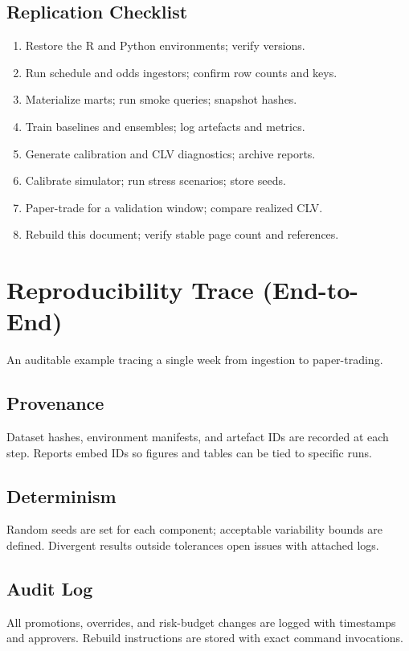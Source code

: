 \subsection{Replication Checklist}
\begin{enumerate}
  \item Restore the R and Python environments; verify versions.
  \item Run schedule and odds ingestors; confirm row counts and keys.
  \item Materialize marts; run smoke queries; snapshot hashes.
  \item Train baselines and ensembles; log artefacts and metrics.
  \item Generate calibration and CLV diagnostics; archive reports.
  \item Calibrate simulator; run stress scenarios; store seeds.
  \item Paper-trade for a validation window; compare realized CLV.
  \item Rebuild this document; verify stable page count and references.
\end{enumerate}

\section{Reproducibility Trace (End-to-End)}\label{app:repro-trace}
An auditable example tracing a single week from ingestion to paper-trading.

\subsection{Provenance}
Dataset hashes, environment manifests, and artefact IDs are recorded at each step. Reports embed IDs so figures and tables can be tied to specific runs.

\subsection{Determinism}
Random seeds are set for each component; acceptable variability bounds are defined. Divergent results outside tolerances open issues with attached logs.

\subsection{Audit Log}
All promotions, overrides, and risk-budget changes are logged with timestamps and approvers. Rebuild instructions are stored with exact command invocations.

